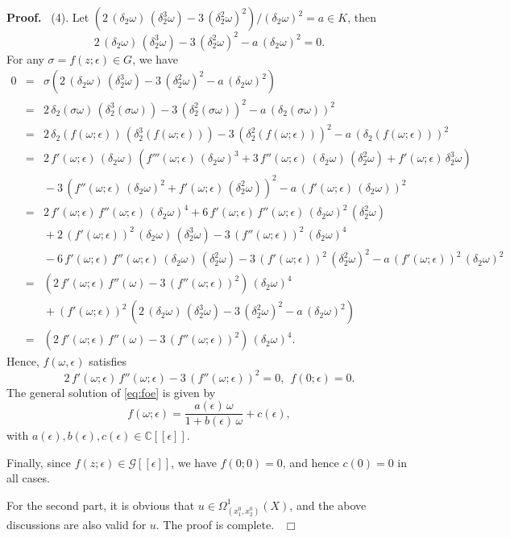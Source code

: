 \documentclass[preprint, 12pt]{elsarticle}
\numberwithin{equation}{section}
\newenvironment{proof}[1][Proof]{\textbf{#1.}\ }{\ $\Box$}
\newcommand{\Comp}{\mathbb{C}}
\newcommand{\G}{\mathcal{G}}
\begin{document}
\begin{proof}
(4). Let $(2\,(\delta_2\omega)\,(\delta_2^3\omega) -
3\,(\delta_2^2\omega)^2)/(\delta_2\omega)^2 = a\in K$, then
$$2\,(\delta_2\omega)\,(\delta_2^3\omega) -
3\,(\delta_2^2\omega)^2 - a\,(\delta_2\omega)^2 = 0.$$ 
For any
$\sigma = f(z;\epsilon)\in G$, we have
\begin{eqnarray*}
0&=&\sigma\left(2\,(\delta_2\omega)\,(\delta_2^3\omega) -
3\,(\delta_2^2\omega)^2- a\,(\delta_2\omega)^2\right)\\
&=&2\,\delta_2(\sigma\omega)\,(\delta_2^3(\sigma\omega)) -
3\,(\delta_2^2(\sigma\omega))^2 - a\,(\delta_2(\sigma\omega))^2\\
&=&2\,\delta_2(f(\omega;\epsilon))\,(\delta_2^3(f(\omega;\epsilon)))
- 3\,(\delta_2^2(f(\omega;\epsilon)))^2 - a\,(\delta_2(f(\omega;\epsilon)))^2\\
&=&2\,f'(\omega;\epsilon)\,(\delta_2\omega)\,\left(f'''(\omega;\epsilon)\,(\delta_2\omega)^3
+ 3\,f''(\omega;\epsilon)\,(\delta_2\omega)\,(\delta_2^2\omega) +
f'(\omega;\epsilon)\,\delta_2^3\omega\right)\\
&&{} - 3\,\left(f''(\omega;\epsilon)\,(\delta_2\omega)^2 +
f'(\omega;\epsilon)\,(\delta_2^2\omega)\right)^2 -
a\,\left(f'(\omega;\epsilon)\,(\delta_2\omega)\right)^2\\
&=&2\,f'(\omega;\epsilon)\,f''(\omega;\epsilon)\,(\delta_2\omega)^4
+
6\,f'(\omega;\epsilon)\,f''(\omega;\epsilon)\,(\delta_2\omega)^2\,(\delta_2^2\omega)\\
&&{}+ 2\,(f'(\omega;\epsilon))^2\,(\delta_2\omega)\,(\delta_2^3\omega) - 3\,(f''(\omega;\epsilon))^2\,(\delta_2\omega)^4 \\
&&{}-
6\,f'(\omega;\epsilon)\,f''(\omega;\epsilon)\,(\delta_2\omega)\,(\delta_2^2\omega)
- 3\,(f'(\omega;\epsilon))^2\,(\delta_2^2\omega)^2 -
a\,(f'(\omega;\epsilon))^2\,(\delta_2\omega)^2\\
&=&\left(2\,f'(\omega;\epsilon)\,f''(\omega) -
3\,(f''(\omega;\epsilon))^2\right)\,(\delta_2\omega)^4 \\
&&{}+
(f'(\omega;\epsilon))^2\,(2\,(\delta_2\omega)\,(\delta_2^3\omega)-3\,(\delta_2^2\omega)^2-a\,(\delta_2\omega)^2)\\
&=&(2\,f'(\omega;\epsilon)\,f''(\omega) -
3\,(f''(\omega;\epsilon))^2)\,(\delta_2\omega)^4.
\end{eqnarray*}
Hence, $f(\omega, \epsilon)$ satisfies 
\begin{equation}
\label{eq:foe}
2\,f'(\omega;\epsilon)\,f''(\omega;\epsilon) -
3\,(f''(\omega;\epsilon))^2 = 0,\ \ f(0;\epsilon) = 0.
\end{equation}
The general solution of \eqref{eq:foe} is given by
$$f(\omega;\epsilon) = \frac{a(\epsilon)\,\omega}{1 + b(\epsilon)\,\omega} + c(\epsilon),$$
with $a(\epsilon), b(\epsilon), c(\epsilon)\in
\Comp[[\epsilon]]$.

Finally, since $f(z;\epsilon)\in \G[[\epsilon]]$, we have $f(0;0) = 0$, and hence $c(0) = 0$ in all cases.

For the second part, it is obvious that $u\in \Omega_{(x_1^0,
x_2^0)}^1(X)$, and the above discussions are also valid for $u$. The
proof is complete.
\end{proof}
\end{document}
